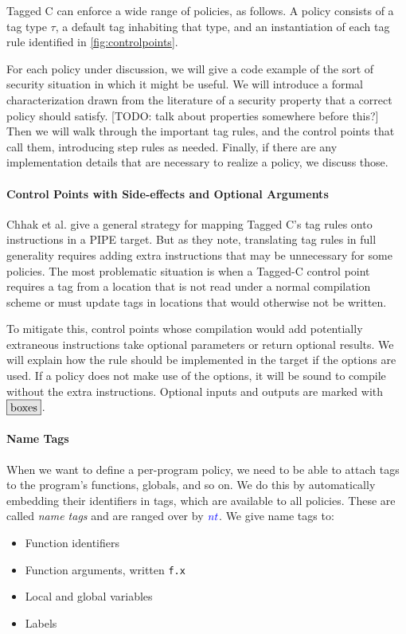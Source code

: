 \documentclass[acmsmall,review,anonymous]{acmart}\settopmatter{printfolios=true,printccs=false,printacmref=false}
\begin{document}
Tagged C can enforce a wide range of policies, as follows.
A policy consists of a tag type \(\tau\), a default tag inhabiting that type, and an instantiation
of each tag rule identified in \cref{fig:controlpoints}.

For each policy under discussion, we will give a code example of the sort of security
situation in which it might be useful. We will introduce a formal characterization drawn
from the literature of a security property that a correct policy should satisfy.
[TODO: talk about properties somewhere before this?]
Then we will walk through the important tag rules, and the control points that call them,
introducing step rules as needed. Finally, if there are any implementation details that
are necessary to realize a policy, we discuss those.

\paragraph*{Control Points with Side-effects and Optional Arguments}

Chhak et al. \cite{Chhak21:Tagine} give a general strategy for mapping Tagged C's tag rules
onto instructions in a PIPE target. But as they note, translating tag rules in full generality
requires adding extra instructions that may be unnecessary for some policies. The most problematic
situation is when a Tagged-C control point requires a tag from a location that is not read under
a normal compilation scheme or must update tags in locations that would otherwise not be written.

To mitigate this, control points whose compilation would add potentially extraneous instructions
take optional parameters or return optional results. We will explain how the rule should be
implemented in the target if the options are used. If a policy does not make use of the options, it will
be sound to compile without the extra instructions. Optional inputs
and outputs are marked with \(\optional{boxes}\).

\paragraph*{Name Tags}

When we want to define a per-program policy, we need to be able to attach tags to the program's
functions, globals, and so on. We do this by automatically embedding their identifiers in tags,
which are available to all policies. These are called {\em name tags} and are ranged over by
\(\mathit{\color{blue} nt}\). We give name tags to:
\begin{itemize}
\item Function identifiers
\item Function arguments, written {\tt f.x}
\item Local and global variables
\item Labels
\end{itemize}
\end{document}
